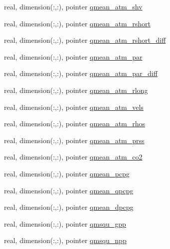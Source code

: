 \begin{DoxyCompactItemize}
real, dimension(\+:,\+:), pointer \hyperlink{structed__state__vars_1_1edtype_a70f48f831afd1b4ad0d8c8bd1c057bfd}{qmean\+\_\+atm\+\_\+shv}
\item 
real, dimension(\+:,\+:), pointer \hyperlink{structed__state__vars_1_1edtype_ab9645df52f7caa3d3d646642534f1f83}{qmean\+\_\+atm\+\_\+rshort}
\item 
real, dimension(\+:,\+:), pointer \hyperlink{structed__state__vars_1_1edtype_ab53e708fadaf876f6984c22ce67be37d}{qmean\+\_\+atm\+\_\+rshort\+\_\+diff}
\item 
real, dimension(\+:,\+:), pointer \hyperlink{structed__state__vars_1_1edtype_a84568296b02258161643fa2ab9f3ae56}{qmean\+\_\+atm\+\_\+par}
\item 
real, dimension(\+:,\+:), pointer \hyperlink{structed__state__vars_1_1edtype_ae09ee9c5856b069b95284345b2ed8780}{qmean\+\_\+atm\+\_\+par\+\_\+diff}
\item 
real, dimension(\+:,\+:), pointer \hyperlink{structed__state__vars_1_1edtype_a2811051d3427b8bcae5fbef1c7b8e6ef}{qmean\+\_\+atm\+\_\+rlong}
\item 
real, dimension(\+:,\+:), pointer \hyperlink{structed__state__vars_1_1edtype_a36c553aff5616771de35d844799d352a}{qmean\+\_\+atm\+\_\+vels}
\item 
real, dimension(\+:,\+:), pointer \hyperlink{structed__state__vars_1_1edtype_a6d4ec4456a99c19678118f1e794a39d2}{qmean\+\_\+atm\+\_\+rhos}
\item 
real, dimension(\+:,\+:), pointer \hyperlink{structed__state__vars_1_1edtype_afd3790e8f5115045a6c3567dbea7dfb3}{qmean\+\_\+atm\+\_\+prss}
\item 
real, dimension(\+:,\+:), pointer \hyperlink{structed__state__vars_1_1edtype_a6820fc07b622f67d42dfb4fd9c9ac285}{qmean\+\_\+atm\+\_\+co2}
\item 
real, dimension(\+:,\+:), pointer \hyperlink{structed__state__vars_1_1edtype_a627c57360fae28fb2e0534cb95b21f18}{qmean\+\_\+pcpg}
\item 
real, dimension(\+:,\+:), pointer \hyperlink{structed__state__vars_1_1edtype_a2b6397e6dd70d097c165477731966b61}{qmean\+\_\+qpcpg}
\item 
real, dimension(\+:,\+:), pointer \hyperlink{structed__state__vars_1_1edtype_a4a7c1dfe24f04524356a71c0fd1239c7}{qmean\+\_\+dpcpg}
\item 
real, dimension(\+:,\+:), pointer \hyperlink{structed__state__vars_1_1edtype_a0995661f86f04d42952f2e4f116af9c0}{qmsqu\+\_\+gpp}
\item 
real, dimension(\+:,\+:), pointer \hyperlink{structed__state__vars_1_1edtype_a436745db6d586bb5a6feed0b8ada637d}{qmsqu\+\_\+npp}

\end{DoxyCompactItemize}
